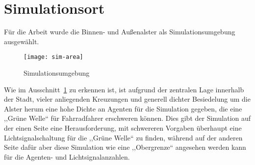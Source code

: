 %


\section{Simulationsort}\label{sec:simulationplace}

Für die Arbeit wurde die Binnen- und Außenalster als Simulationsumgebung ausgewählt.

\begin{figure}[h]
    \centering
    \texttt{[image: sim-area]}
    \caption{Simulationsumgebung}
    \label{fig:sim-area}
\end{figure}

Wie im Ausschnitt~\ref{fig:sim-area} zu erkennen ist, ist aufgrund der zentralen Lage innerhalb der Stadt, vieler anliegenden Kreuzungen und generell dichter Besiedelung um die Alster herum eine hohe Dichte an Agenten für die Simulation gegeben, die eine ,,Grüne Welle`` für Fahrradfahrer erschweren können.
Dies gibt der Simulation auf der einen Seite eine Herausforderung, mit schwereren Vorgaben überhaupt eine Lichtsignalschaltung für die ,,Grüne Welle`` zu finden, während auf der anderen Seite dafür aber diese Simulation wie eine ,,Obergrenze`` angesehen werden kann für die Agenten- und Lichtsignalanzahlen.
